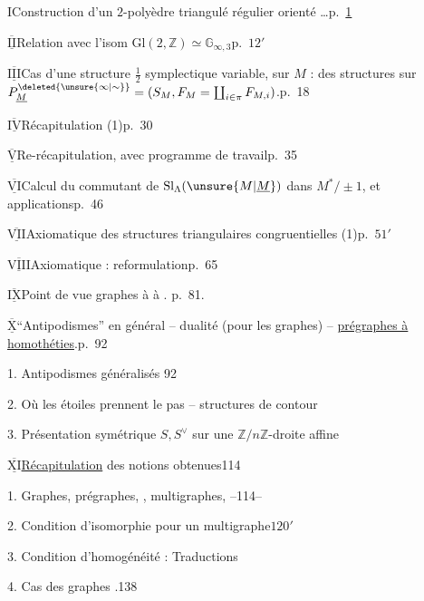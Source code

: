 I\quad Construction d'un $2$-polyèdre triangulé régulier orienté \ldots\hfill p.~\uline{1}

$\overline{\underline{\mathrm{II}}}$\quad Relation avec l'isom $\mathrm{Gl}(2,\mathbb{Z})\simeq\mathbb{G}_{\infty,3}$\hfill p.~$12'$

$\overline{\underline{\mathrm{III}}}$\quad Cas d'une structure $\frac12$ symplectique variable, sur $M$ :  des structures sur $P^{\deleted{\unsure{\infty|\sim}}}_{\underline M}=(S_M,F_M=\coprod_{i\in\pi}F_{M,i})$.\hfill p.~18

$\overline{\underline{\mathrm{IV}}}$\quad Récapitulation (1)\hfill p.~30

$\overline{\underline{\mathrm{V}}}$\quad Re-récapitulation, avec programme de travail\hfill p.~35

$\overline{\underline{\mathrm{VI}}}$\quad Calcul du commutant de $\mathrm{Sl}_{\Lambda}(\unsure{M|\underline M})$ dans $M^*/\pm1$, et applications\hfill p.~46

$\overline{\underline{\mathrm{VII}}}$\quad Axiomatique des structures triangulaires congruentielles (1)\hfill p.~$51'$

$\overline{\underline{\mathrm{VIII}}}$\quad Axiomatique : reformulation\hfill p.~65

$\overline{\underline{\mathrm{IX}}}$\quad Point de vue graphes à   à  . \hfill p.~81.

$\overline{\underline{\mathrm{X}}}$\quad ``Antipodismes'' en général -- dualité (pour les  graphes) -- \uline{prégraphes à homothéties}.\hfill p.~92

1. Antipodismes généralisés\hfill {}  92

2. Où les étoiles prennent le pas -- structures de contour  

3. Présentation symétrique $S,S^\vee$ sur une $\mathbb{Z}/n\mathbb{Z}$-droite affine


$\overline{\underline{\mathrm{XI}}}$\quad \uline{Récapitulation} des notions obtenues\hfill 114

1. Graphes, prégraphes, , multigraphes,  --\hfill 114\qquad --

2. Condition d'isomorphie pour un multigraphe\hfill $120'$

3. Condition d'homogénéité : Traductions \hfill {}

4. Cas des graphes .\hfill 138

